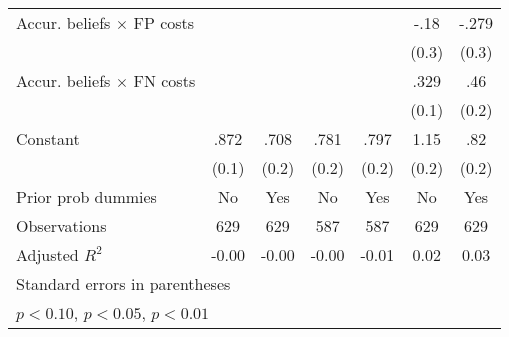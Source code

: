 \begin{table}[htbp]
\begin{tabular}{l*{6}{c}}
Accur. beliefs $\times$ FP costs&                  &                  &                  &                  &     -.18         &    -.279         \\
                &                  &                  &                  &                  &    (0.3)         &    (0.3)         \\
Accur. beliefs $\times$ FN costs&                  &                  &                  &                  &     .329\sym{**} &      .46\sym{***}\\
                &                  &                  &                  &                  &    (0.1)         &    (0.2)         \\
Constant        &     .872\sym{***}&     .708\sym{***}&     .781\sym{***}&     .797\sym{***}&     1.15\sym{***}&      .82\sym{***}\\
                &    (0.1)         &    (0.2)         &    (0.2)         &    (0.2)         &    (0.2)         &    (0.2)         \\
Prior prob dummies &       No         &      Yes         &       No         &      Yes         &       No         &      Yes         \\
\hline
Observations    &      629         &      629         &      587         &      587         &      629         &      629         \\
Adjusted \(R^{2}\)&    -0.00         &    -0.00         &    -0.00         &    -0.01         &     0.02         &     0.03         \\
\hline\hline
\multicolumn{7}{l}{\footnotesize Standard errors in parentheses}\\
\multicolumn{7}{l}{\footnotesize \sym{*} \(p<0.10\), \sym{**} \(p<0.05\), \sym{***} \(p<0.01\)}\\
\end{tabular}
\end{table}
